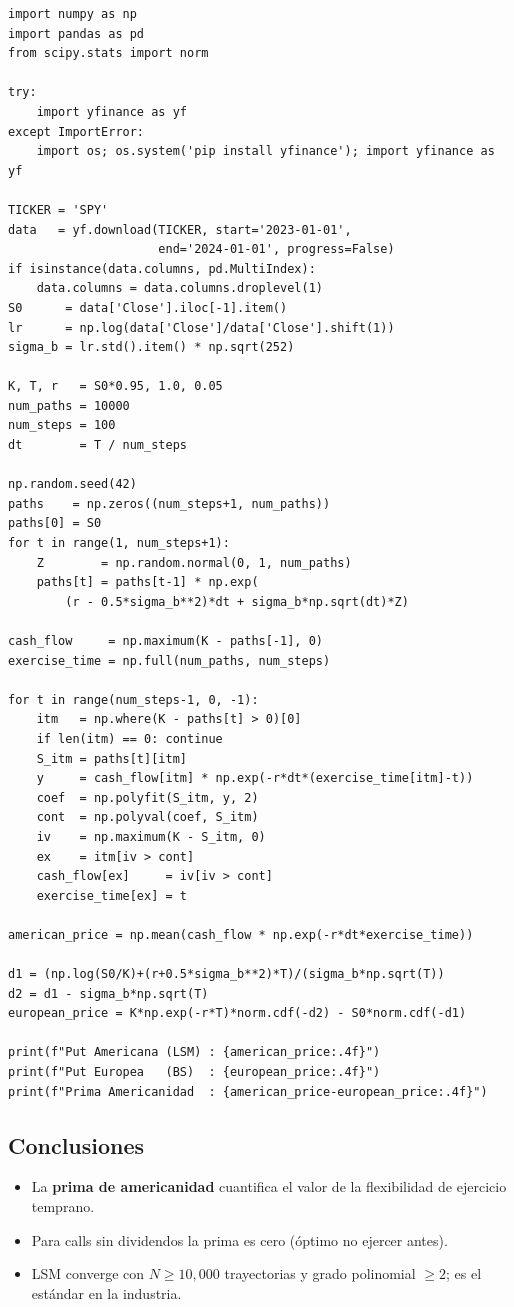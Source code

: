 \documentclass[12pt,letterpaper]{article}
\begin{document}
\begin{lstlisting}[style=python, caption={Laboratorio 4 -- Longstaff-Schwartz}]
import numpy as np
import pandas as pd
from scipy.stats import norm

try:
    import yfinance as yf
except ImportError:
    import os; os.system('pip install yfinance'); import yfinance as yf

TICKER = 'SPY'
data   = yf.download(TICKER, start='2023-01-01',
                     end='2024-01-01', progress=False)
if isinstance(data.columns, pd.MultiIndex):
    data.columns = data.columns.droplevel(1)
S0      = data['Close'].iloc[-1].item()
lr      = np.log(data['Close']/data['Close'].shift(1))
sigma_b = lr.std().item() * np.sqrt(252)

K, T, r   = S0*0.95, 1.0, 0.05
num_paths = 10000
num_steps = 100
dt        = T / num_steps

np.random.seed(42)
paths    = np.zeros((num_steps+1, num_paths))
paths[0] = S0
for t in range(1, num_steps+1):
    Z        = np.random.normal(0, 1, num_paths)
    paths[t] = paths[t-1] * np.exp(
        (r - 0.5*sigma_b**2)*dt + sigma_b*np.sqrt(dt)*Z)

cash_flow     = np.maximum(K - paths[-1], 0)
exercise_time = np.full(num_paths, num_steps)

for t in range(num_steps-1, 0, -1):
    itm   = np.where(K - paths[t] > 0)[0]
    if len(itm) == 0: continue
    S_itm = paths[t][itm]
    y     = cash_flow[itm] * np.exp(-r*dt*(exercise_time[itm]-t))
    coef  = np.polyfit(S_itm, y, 2)
    cont  = np.polyval(coef, S_itm)
    iv    = np.maximum(K - S_itm, 0)
    ex    = itm[iv > cont]
    cash_flow[ex]     = iv[iv > cont]
    exercise_time[ex] = t

american_price = np.mean(cash_flow * np.exp(-r*dt*exercise_time))

d1 = (np.log(S0/K)+(r+0.5*sigma_b**2)*T)/(sigma_b*np.sqrt(T))
d2 = d1 - sigma_b*np.sqrt(T)
european_price = K*np.exp(-r*T)*norm.cdf(-d2) - S0*norm.cdf(-d1)

print(f"Put Americana (LSM) : {american_price:.4f}")
print(f"Put Europea   (BS)  : {european_price:.4f}")
print(f"Prima Americanidad  : {american_price-european_price:.4f}")
\end{lstlisting}

\subsection{Conclusiones}

\begin{itemize}
  \item La \textbf{prima de americanidad} cuantifica el valor de la flexibilidad
    de ejercicio temprano.
  \item Para calls sin dividendos la prima es cero (\'optimo no ejercer antes).
  \item LSM converge con $N \geq 10{,}000$ trayectorias y grado polinomial
    $\geq 2$; es el est\'andar en la industria.
\end{itemize}
\end{document}

